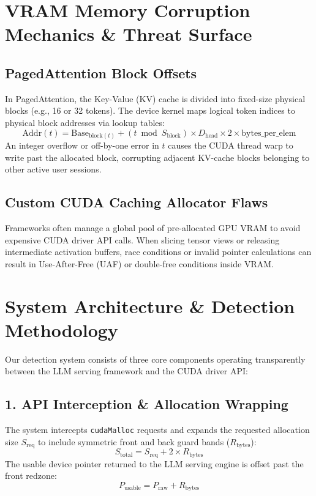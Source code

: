 \documentclass[11pt,a4paper]{article}
\begin{document}
\section{VRAM Memory Corruption Mechanics \& Threat Surface}

\subsection{PagedAttention Block Offsets}
In PagedAttention, the Key-Value (KV) cache is divided into fixed-size physical blocks (e.g., 16 or 32 tokens). The device kernel maps logical token indices to physical block addresses via lookup tables:
\begin{equation}
\text{Addr}(t) = \text{Base}_{\text{block}(t)} + \left( t \bmod S_{\text{block}} \right) \times D_{\text{head}} \times 2 \times \text{bytes\_per\_elem}
\end{equation}
An integer overflow or off-by-one error in $t$ causes the CUDA thread warp to write past the allocated block, corrupting adjacent KV-cache blocks belonging to other active user sessions.

\subsection{Custom CUDA Caching Allocator Flaws}
Frameworks often manage a global pool of pre-allocated GPU VRAM to avoid expensive CUDA driver API calls. When slicing tensor views or releasing intermediate activation buffers, race conditions or invalid pointer calculations can result in Use-After-Free (UAF) or double-free conditions inside VRAM.

\section{System Architecture \& Detection Methodology}

Our detection system consists of three core components operating transparently between the LLM serving framework and the CUDA driver API:

\subsection{1. API Interception \& Allocation Wrapping}
The system intercepts \texttt{cudaMalloc} requests and expands the requested allocation size $S_{\text{req}}$ to include symmetric front and back guard bands ($R_{\text{bytes}}$):
\begin{equation}
S_{\text{total}} = S_{\text{req}} + 2 \times R_{\text{bytes}}
\end{equation}
The usable device pointer returned to the LLM serving engine is offset past the front redzone:
\begin{equation}
P_{\text{usable}} = P_{\text{raw}} + R_{\text{bytes}}
\end{equation}
\end{document}
